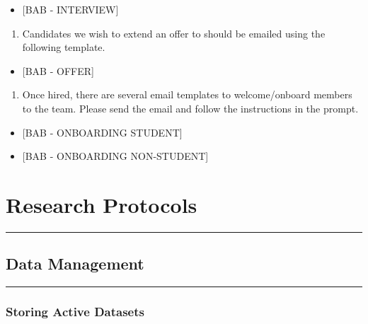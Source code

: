 \documentclass[]{book}
\providecommand{\tightlist}{%
  \setlength{\itemsep}{0pt}\setlength{\parskip}{0pt}}
\begin{document}
\begin{itemize}
\tightlist
\item
  {[}BAB - INTERVIEW{]}
\end{itemize}

\begin{enumerate}
\def\labelenumi{\arabic{enumi}.}
\setcounter{enumi}{2}
\tightlist
\item
  Candidates we wish to extend an offer to should be emailed using the
  following template.
\end{enumerate}

\begin{itemize}
\tightlist
\item
  {[}BAB - OFFER{]}
\end{itemize}

\begin{enumerate}
\def\labelenumi{\arabic{enumi}.}
\setcounter{enumi}{3}
\tightlist
\item
  Once hired, there are several email templates to welcome/onboard
  members to the team. Please send the email and follow the instructions
  in the prompt.
\end{enumerate}

\begin{itemize}
\tightlist
\item
  {[}BAB - ONBOARDING STUDENT{]}
\item
  {[}BAB - ONBOARDING NON-STUDENT{]}
\end{itemize}

\chapter{Research Protocols}\label{research-protocols}

\begin{center}\rule{0.5\linewidth}{0.5pt}\end{center}

\section{Data Management}\label{data-management}

\begin{center}\rule{0.5\linewidth}{0.5pt}\end{center}

\subsection{Storing Active Datasets}\label{storing-active-datasets}
\end{document}
